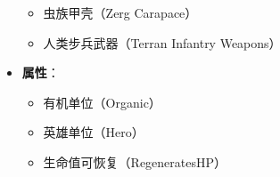 \begin{tcolorbox}[colback=white, colframe=black!60!white, title=Hero\_Infested\_Duran(), arc=0mm]
\begin{itemize}
            \begin{itemize}
                \item 虫族甲壳（Zerg Carapace）
                \item 人类步兵武器（Terran Infantry Weapons）
            \end{itemize}
        \item \textbf{属性}：
            \begin{itemize}
                \item 有机单位（Organic）
                \item 英雄单位（Hero）
                \item 生命值可恢复（RegeneratesHP）
            \end{itemize}
    \end{itemize}
\end{tcolorbox}

